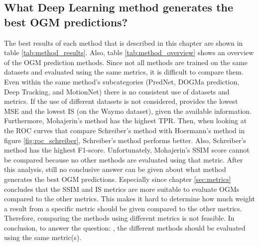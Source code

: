 \subsection{What Deep Learning method generates the best \gls{OGM} predictions?} \label{subsec:con_method}
The best results of each method that is described in this chapter are shown in table \ref{tab:method_results}. Also, table \ref{tab:method_overview} shows an overview of the \gls{OGM} prediction methods. Since not all methods are trained on the same datasets and evaluated using the same metrics, it is difficult to compare them. Even within the same method's subcategories (PredNet, \gls{DOGMa} prediction, Deep Tracking, and MotionNet) there is no consistent use of datasets and metrics. If the use of different datasets is not considered, \cite{lange2020attention} provides the lowest \gls{MSE} and the lowest \gls{IS} (on the Waymo \cite{sun2020scalability} dataset), given the available information. Furthermore, Mohajerin's \cite{mohajerin2019multi} method has the highest \gls{TPR}. Then, when looking at the \gls{ROC} curves that compare Schreiber's method \cite{schreiber2019long} with Hoermann's method \cite{hoermann2018dynamic} in figure \ref{fig:roc_schreiber}, Schreiber's method \cite{schreiber2019long} performs better. Also, Schreiber's method \cite{schreiber2019long} has the highest F1-score. Unfortunately, Mohajerin's \cite{mohajerin2019multi} \gls{SSIM} score cannot be compared because no other methods are evaluated using that metric. After this analysis, still no conclusive answer can be given about what method generates the best \gls{OGM} predictions. Especially since chapter \ref{sec:metrics} concludes that the \gls{SSIM} and \gls{IS} metrics are more suitable to evaluate \glspl{OGM} compared to the other metrics. This makes it hard to determine how much weight a result from a specific metric should be given compared to the other metrics. Therefore, comparing the methods using different metrics is not feasible. In conclusion, to answer the question: , the different methods should be evaluated using the same metric(s). 

